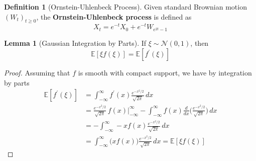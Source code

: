 \documentclass{article}
\theoremstyle{definition}
\newtheorem{lemma}[theorem]{Lemma}
\theoremstyle{remark}
\theoremstyle{definition}
\newtheorem{definition}{Definition}[section]
\begin{document}
\begin{definition}[Ornstein-Uhlenbeck Process]
Given standard Brownian motion $(W_t)_{t \geq 0}$, the \textbf{Ornstein-Uhlenbeck process} is defined as 
\[X_t = e^{-t} X_0 + e^{-t} W_{e^{2t} - 1}\]
\end{definition}

\begin{lemma}[Gaussian Integration by Parts]
If $\xi \sim \mathcal{N}(0, 1)$, then 
\[\mathbb{E}[ \xi f(\xi)] = \mathbb{E}[f^\prime (\xi)]\]
\end{lemma}
\begin{proof}
Assuming that $f$ is smooth with compact support, we have by integration by parts 
\begin{align*}
    \mathbb{E}[f^\prime (\xi)] & = \int_{-\infty}^\infty f^\prime(x) \frac{e^{-x^2 / 2}}{\sqrt{2\pi}} \,dx \\ 
    & = \frac{e^{-x^2 / 2}}{\sqrt{2\pi}} \, f(x) \bigg|_{-\infty}^\infty - \int_{-\infty}^\infty f(x) \frac{d}{dx} \bigg(\frac{e^{-x^2 / 2}}{\sqrt{2\pi}}\bigg) \,dx \\
    & = - \int_{-\infty}^\infty -x f(x) \frac{e^{-x^2 / 2}}{\sqrt{2\pi}} \,dx \\
    & = \int_{-\infty}^\infty \big( x f(x)\big) \frac{e^{-x^2 / 2}}{\sqrt{2\pi}}\,dx = \mathbb{E}[\xi f(\xi)]
\end{align*}
\end{proof}
\end{document}
